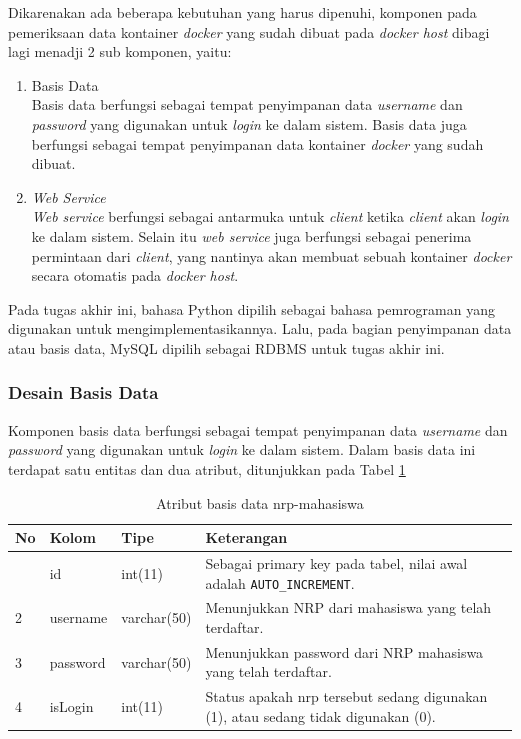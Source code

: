     Dikarenakan ada beberapa kebutuhan yang harus dipenuhi, komponen pada pemeriksaan data kontainer \textit{docker} yang sudah dibuat pada \textit{docker host} dibagi lagi menadji 2 sub komponen, yaitu:
   	\begin{enumerate}
   		\item Basis Data \\
   		Basis data berfungsi sebagai tempat penyimpanan data \textit{username} dan \textit{password} yang digunakan untuk \textit{login} ke dalam sistem. Basis data juga berfungsi sebagai tempat penyimpanan data kontainer \textit{docker} yang sudah dibuat.
   		\item \textit{Web Service} \\
   		\textit{Web service} berfungsi sebagai antarmuka untuk \textit{client} ketika \textit{client} akan \textit{login} ke dalam sistem. Selain itu \textit{web service} juga berfungsi sebagai penerima permintaan dari \textit{client}, yang nantinya akan membuat sebuah kontainer \textit{docker} secara otomatis pada \textit{docker host}.
   	\end{enumerate}
   	
   	Pada tugas akhir ini, bahasa Python dipilih sebagai bahasa pemrograman yang digunakan untuk mengimplementasikannya. Lalu, pada bagian penyimpanan data atau basis data, MySQL dipilih sebagai RDBMS untuk tugas akhir ini.
   	\subsubsection{Desain Basis Data}
   	Komponen basis data berfungsi sebagai tempat penyimpanan data \textit{username} dan \textit{password} yang digunakan untuk \textit{login} ke dalam sistem. Dalam basis data ini terdapat satu entitas dan dua atribut, ditunjukkan pada Tabel \ref{tabelnrpmahasiswa}
   	\begin{longtable}{|p{}|p{}|p{}|p{}|}
   		\caption{Atribut basis data nrp-mahasiswa} \label{tabelnrpmahasiswa} \\
   		\hline
   		\textbf{No} & \textbf{Kolom} & \textbf{Tipe} & \textbf{Keterangan} \\ \hline
   		\endhead
   		\endfoot
   		\endlastfoot
   		1 & id & int(11) & Sebagai primary key pada tabel, nilai awal adalah \texttt{AUTO\_INCREMENT}. \\ \hline
   		2 & username & varchar(50) & Menunjukkan NRP dari mahasiswa yang telah terdaftar. \\ \hline
   		3 & password & varchar(50) & Menunjukkan password dari NRP mahasiswa yang telah terdaftar. \\ \hline
   		4 & isLogin & int(11) & Status apakah nrp tersebut sedang digunakan (1), atau sedang tidak digunakan (0). \\ \hline
   	\end{longtable}
   	
